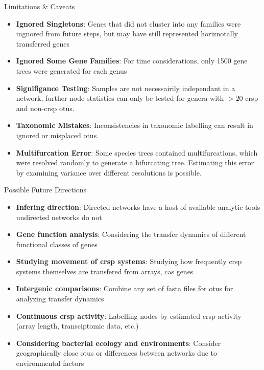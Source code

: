 \documentclass[dvipsnames]{beamer}
\begin{document}
\begin{frame}[fragile]{Limitations \& Caveats}
    \begin{itemize}
        \item<2-> \textbf{Ignored Singletons}: Genes that did not cluster into any families were ingnored from future steps, but may have still represented horiznotally transferred genes
        \item<3-> \textbf{Ignored Some Gene Families}: For time considerations, only 1500 gene trees were generated for each genus
        \item<4-> \textbf{Signifigance Testing}: Samples are not necessairily independant in a network, further node statistics can only be tested for genera with $> 20$ \ac{crsp} and non-\ac{crsp} \ac{otu}s.
        \item<5-> \textbf{Taxonomic Mistakes}: Inconsistencies in taxonomic labelling can result in ignored or misplaced \ac{otu}s.
        \item<6-> \textbf{Multifurcation Error}: Some species trees contained multifurcations, which were resolved randomly to generate a bifurcating tree. Estimating this error by examining variance over different resolutions is possible.
    \end{itemize}
\end{frame}
\begin{frame}[fragile]{Possible Future Directions}
    \begin{itemize}
        \item<2-> \textbf{Infering direction}: Directed networks have a host of available analytic tools undirected networks do not
        \item<3-> \textbf{Gene function analysis}: Considering the transfer dynamics of different functional classes of genes
        \item<4-> \textbf{Studying movement of \ac{crsp} systems}: Studying how frequently \ac{crsp} systems themselves are transfered from arrays, cas genes
        \item<5-> \textbf{Intergenic comparisons}: Combine any set of fasta files for \ac{otu}s for analyzing transfer dynamics
        \item<6-> \textbf{Continuous \ac{crsp} activity}: Labelling nodes by estimated \ac{crsp} activity (array length, transciptomic data, etc.)
        \item<7-> \textbf{Considering bacterial ecology and environments}: Consider geographically close \ac{otu}s or differences between networks due to environmental factors
    \end{itemize}
\end{frame}
\end{document}
